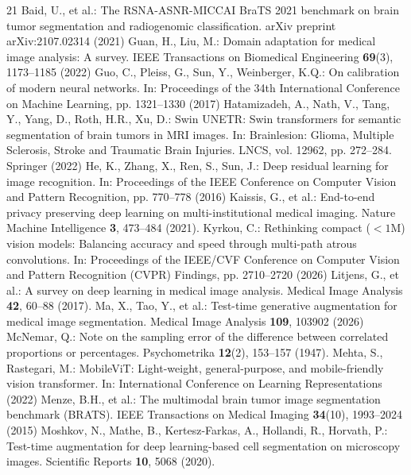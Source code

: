 \begin{thebibliography}{21}
 Baid, U., et al.: The RSNA-ASNR-MICCAI BraTS 2021 benchmark on brain tumor segmentation and radiogenomic classification. arXiv preprint arXiv:2107.02314 (2021)
 Guan, H., Liu, M.: Domain adaptation for medical image analysis: A survey. IEEE Transactions on Biomedical Engineering \textbf{69}(3), 1173--1185 (2022)
 Guo, C., Pleiss, G., Sun, Y., Weinberger, K.Q.: On calibration of modern neural networks. In: Proceedings of the 34th International Conference on Machine Learning, pp. 1321--1330 (2017)
 Hatamizadeh, A., Nath, V., Tang, Y., Yang, D., Roth, H.R., Xu, D.: Swin UNETR: Swin transformers for semantic segmentation of brain tumors in MRI images. In: Brainlesion: Glioma, Multiple Sclerosis, Stroke and Traumatic Brain Injuries. LNCS, vol. 12962, pp. 272--284. Springer (2022)
 He, K., Zhang, X., Ren, S., Sun, J.: Deep residual learning for image recognition. In: Proceedings of the IEEE Conference on Computer Vision and Pattern Recognition, pp. 770--778 (2016)
 Kaissis, G., et al.: End-to-end privacy preserving deep learning on multi-institutional medical imaging. Nature Machine Intelligence \textbf{3}, 473--484 (2021). 
 Kyrkou, C.: Rethinking compact ($<1$M) vision models: Balancing accuracy and speed through multi-path atrous convolutions. In: Proceedings of the IEEE/CVF Conference on Computer Vision and Pattern Recognition (CVPR) Findings, pp. 2710--2720 (2026)
 Litjens, G., et al.: A survey on deep learning in medical image analysis. Medical Image Analysis \textbf{42}, 60--88 (2017). 
 Ma, X., Tao, Y., et al.: Test-time generative augmentation for medical image segmentation. Medical Image Analysis \textbf{109}, 103902 (2026)
 McNemar, Q.: Note on the sampling error of the difference between correlated proportions or percentages. Psychometrika \textbf{12}(2), 153--157 (1947). 
 Mehta, S., Rastegari, M.: MobileViT: Light-weight, general-purpose, and mobile-friendly vision transformer. In: International Conference on Learning Representations (2022)
 Menze, B.H., et al.: The multimodal brain tumor image segmentation benchmark (BRATS). IEEE Transactions on Medical Imaging \textbf{34}(10), 1993--2024 (2015)
 Moshkov, N., Mathe, B., Kertesz-Farkas, A., Hollandi, R., Horvath, P.: Test-time augmentation for deep learning-based cell segmentation on microscopy images. Scientific Reports \textbf{10}, 5068 (2020). 

\end{thebibliography}
